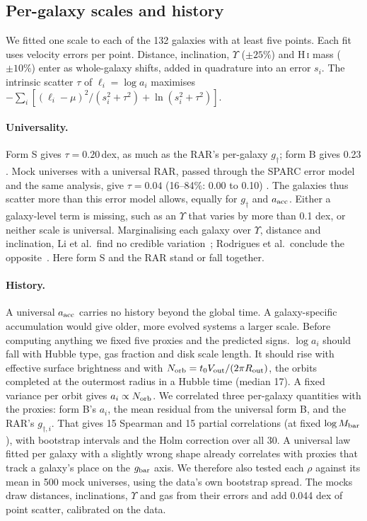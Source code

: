 \subsection{Per-galaxy scales and history}\label{sec:remnant-history}

We fitted one scale to each of the 132 galaxies with at least five points. Each fit uses velocity errors per point. Distance, inclination,
$\Upsilon$ ($\pm25\%$) and H\,\textsc{i} mass ($\pm10\%$) enter as whole-galaxy shifts, added in quadrature into an error $s_i$. The intrinsic
scatter $\tau$ of $\ell_i=\log a_i$ maximises $-\sum_i[(\ell_i-\mu)^2/(s_i^2+\tau^2)+\ln(s_i^2+\tau^2)]$.

\paragraph{Universality.} Form S gives $\tau=0.20$\,dex, as much as the RAR's per-galaxy $g_\dagger$; form B gives 0.23 .
Mock universes with a universal RAR, passed through the SPARC error model and the same analysis, give $\tau=0.04$ (16--84\%: 0.00 to 0.10)
. The galaxies thus scatter more than this error model allows, equally for $g_\dagger$ and $a_{\rm acc}$. Either a
galaxy-level term is missing, such as an $\Upsilon$ that varies by more than 0.1 dex, or neither scale is universal. Marginalising each
galaxy over $\Upsilon$, distance and inclination, Li et al.\ find no credible variation~\cite{li2018}; Rodrigues et al.\ conclude the
opposite~\cite{rodrigues2018}. Here form S and the RAR stand or fall together.

\paragraph{History.} A universal $a_{\rm acc}$ carries no history beyond the global time. A galaxy-specific accumulation would give older,
more evolved systems a larger scale. Before computing anything we fixed five proxies and the predicted signs. $\log a_i$ should fall with
Hubble type, gas fraction and disk scale length. It should rise with effective surface brightness and with
$N_{\rm orb}=t_0V_{\rm out}/(2\pi R_{\rm out})$, the orbits completed at the outermost radius in a Hubble time (median 17). A fixed variance per
orbit gives $a_i\propto N_{\rm orb}$. We correlated three per-galaxy quantities with the proxies: form B's $a_i$, the mean residual from the
universal form B, and the RAR's $g_{\dagger,i}$. That gives 15 Spearman and 15 partial correlations (at fixed $\log M_{\rm bar}$), with
bootstrap intervals and the Holm correction over all 30. A universal law fitted per galaxy with a slightly wrong shape already correlates
with proxies that track a galaxy's place on the $g_{\rm bar}$ axis. We therefore also tested each $\rho$ against its mean in 500 mock
universes, using the data's own bootstrap spread. The mocks draw distances, inclinations, $\Upsilon$ and gas from their errors and add
0.044 dex of point scatter, calibrated on the data.

